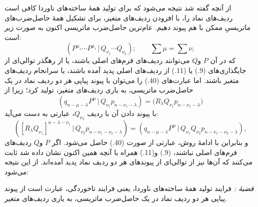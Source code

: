 \documentclass[11pt]{article}
\newcommand{\srcLTR}[1]{\relax\ifmmode\text{\mbox{\babelsublr{\foreignlanguage{english}{#1}}}}\else\babelsublr{\foreignlanguage{english}{#1}}\fi}
\providecommand{\pair}[2]{(#1\,|\,#2)}
\begin{document}
از آنچه گفته شد نتیجه می‌شود که برای تولید همهٔ ساخته‌های ناوردا کافی است ردیف‌های نماد را، با افزودن ردیف‌های متغیر، برای تشکیل همهٔ حاصل‌ضرب‌های ماتریسیِ ممکن با هم پیوند دهیم. عام‌ترین حاصل‌ضرب ماتریسی اکنون به صورت زیر است:
\begin{equation}
 \pair{P^{\mu_1}\cdots P^{\mu_i}}{Q_{\nu_1}\cdots Q_{\nu_k}};\qquad \sum\mu=\sum\nu,
\tag{40}
\end{equation}
که در آن $P$ و$Q$ می‌توانند ردیف‌های فرم‌های اصلی باشند، یا از رهگذر توالی‌ای از جایگذاری‌های (9.) یا (11.) از ردیف‌های اصلی پدید آمده باشند، یا سرانجام ردیف‌های متغیر باشند. اما عبارت‌های (40.) را می‌توان با پیوند پیاپی هر دو ردیف نماد در یک حاصل‌ضرب ماتریسی، به یاری ردیف‌های متغیر، تولید کرد؛ زیرا از
\[
 \pair{q_{n-\mu-\lambda}P^\mu}{Q_{\nu_1}p_{n-\nu_1-\lambda}}
 =\bigl(R_\lambda Q_{\nu_1}p_{n-\nu_1-\lambda}\bigr)
\]
با پیوند دادن آن با ردیف $Q_{\nu_2}$، عبارتی به دست می‌آید:
\[
 \pair{[R_\lambda Q_{\nu_1}]^{n-\lambda-\nu_1}}{Q_{\nu_2}p_{n-\nu_1-\nu_2-\lambda}}
 =\pair{q_{n-\mu-\lambda}P^\mu}{Q_{\nu_1}Q_{\nu_2}p_{n-\nu_1-\nu_2-\lambda}},
\]
و بنابراین با ادامهٔ روش، عبارتی از صورت (40.) حاصل می‌شود. اگر $P$ و$Q$ ردیف‌های فرم‌های اصلی نباشند، (9.) و(11.) همراه با آنچه همین اکنون نشان داده شد ثابت می‌کنند که آن‌ها نیز از توالی‌ای از پیوندهای هر دو ردیف نماد پدید آمده‌اند. از این نتیجه می‌شود:

\emph{قضیهٔ \srcLTR{V}:} فرایند تولید همهٔ ساخته‌های ناوردا، یعنی فرایند تاخوردگی، عبارت است از پیوند پیاپی هر دو ردیف نماد در یک حاصل‌ضرب ماتریسی، به یاری ردیف‌های متغیر.
\end{document}
